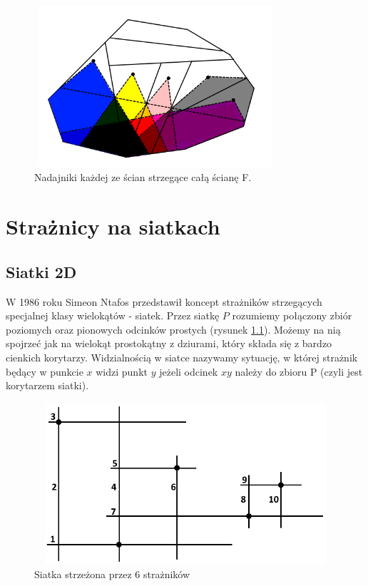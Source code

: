 \documentclass[brudnopis]{xmgr}
\theoremstyle{definition}
\begin{document}
\begin{figure}[ht!]
  \centering
  \label{pokrycie f}
  \includegraphics[width=9cm,height=6cm]{rysunki/pokrycie_f.png}
  \caption{Nadajniki każdej ze ścian strzegące całą ścianę F.}
  \vspace{6in}
\end{figure} 

\chapter{Strażnicy na siatkach}
\section{Siatki 2D}
W 1986 roku Simeon Ntafos przedstawił koncept strażników strzegących specjalnej klasy wielokątów - siatek.
Przez siatkę $P$ rozumiemy połączony zbiór poziomych oraz pionowych odcinków prostych (rysunek \ref{fig:siatka 2d}). Możemy na nią spojrzeć jak na wielokąt prostokątny z dziurami, który składa się z bardzo cienkich korytarzy.
Widzialnością w siatce nazywamy sytuację, w której strażnik będący w punkcie $x$ widzi punkt $y$ jeżeli odcinek $xy$ należy do zbioru P (czyli jest korytarzem siatki).
 \begin{figure}[ht!]
   \centering
   \includegraphics[width=14cm,height=6cm]{rysunki/przykladowa_siatka.png}
   \caption{Siatka strzeżona przez 6 strażników}
   \label{fig:siatka 2d}
 \end{figure} 
\end{document}
